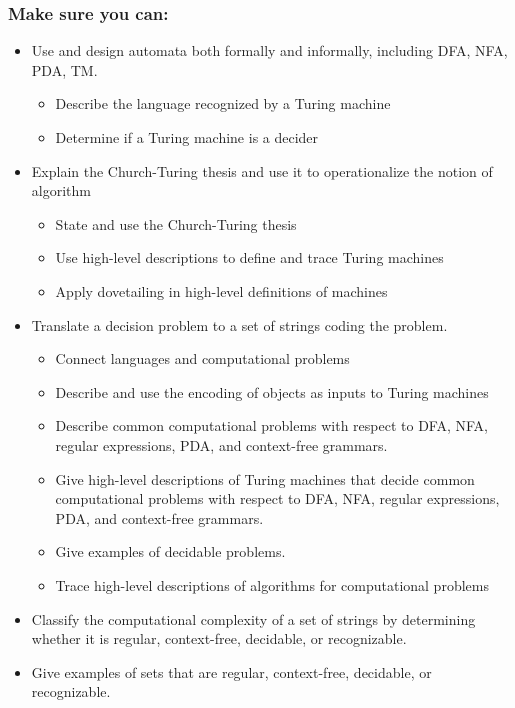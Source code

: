 \subsubsection*{Make sure you can:}
\begin{itemize}
\item Use and design automata both formally and informally, including DFA, NFA, PDA, TM.
    \begin{itemize}
        \item Describe the language recognized by a Turing machine
        \item Determine if a Turing machine is a decider
    \end{itemize}
\item Explain the Church-Turing thesis and use it to operationalize the notion of algorithm
    \begin{itemize}
        \item State and use the Church-Turing thesis
        \item Use high-level descriptions to define and trace Turing machines
        \item Apply dovetailing in high-level definitions of machines
    \end{itemize}
\item Translate a decision problem to a set of strings coding the problem.
    \begin{itemize}
        \item Connect languages and computational problems
        \item Describe and use the encoding of objects as inputs to Turing machines
        \item Describe common computational problems with respect to DFA, NFA, regular expressions, PDA, and context-free grammars.
        \item Give high-level descriptions of Turing machines that decide common computational problems with respect to DFA, NFA, regular expressions, PDA, and context-free grammars.
        \item Give examples of decidable problems.
        \item Trace high-level descriptions of algorithms for computational problems
    \end{itemize}
\item Classify the computational complexity of a set of strings by determining whether it is regular, context-free, decidable, or recognizable.
\item Give examples of sets that are regular, context-free, decidable, or recognizable.
\end{itemize}

